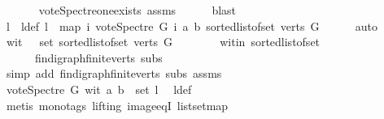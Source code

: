 \begin{isabellebody}
\ \ \ \ \isamarkupfalse%
\ \ vote{\isacharunderscore}{\kern0pt}Spectre{\isacharunderscore}{\kern0pt}one{\isacharunderscore}{\kern0pt}exists\ assms\isanewline
\ \ \ \ \isamarkupfalse%
\ blast\ \isanewline
\ \ \isamarkupfalse%
\ l\ \ l{\isacharunderscore}{\kern0pt}def{\isacharcolon}{\kern0pt}\ {\isachardoublequoteopen}l\ {\isacharequal}{\kern0pt}\ {\isacharparenleft}{\kern0pt}map\ {\isacharparenleft}{\kern0pt}{\isasymlambda}i{\isachardot}{\kern0pt}\ vote{\isacharunderscore}{\kern0pt}Spectre\ G\ i\ a\ b{\isacharparenright}{\kern0pt}\ {\isacharparenleft}{\kern0pt}sorted{\isacharunderscore}{\kern0pt}list{\isacharunderscore}{\kern0pt}of{\isacharunderscore}{\kern0pt}set\ {\isacharparenleft}{\kern0pt}verts\ G{\isacharparenright}{\kern0pt}{\isacharparenright}{\kern0pt}{\isacharparenright}{\kern0pt}{\isachardoublequoteclose}\isanewline
\ \ \ \ \isamarkupfalse%
\ auto\isanewline
\ \ \isamarkupfalse%
\ {\isachardoublequoteopen}wit\ {\isasymin}\ \ set\ {\isacharparenleft}{\kern0pt}sorted{\isacharunderscore}{\kern0pt}list{\isacharunderscore}{\kern0pt}of{\isacharunderscore}{\kern0pt}set\ {\isacharparenleft}{\kern0pt}verts\ G{\isacharparenright}{\kern0pt}{\isacharparenright}{\kern0pt}{\isachardoublequoteclose}\ \isanewline
\ \ \ \ \isamarkupfalse%
\ \ wit{\isacharunderscore}{\kern0pt}in\ sorted{\isacharunderscore}{\kern0pt}list{\isacharunderscore}{\kern0pt}of{\isacharunderscore}{\kern0pt}set{\isacharparenleft}{\kern0pt}{}{\isacharparenright}{\kern0pt}\ \isanewline
\ \ \ \ \ \ fin{\isacharunderscore}{\kern0pt}digraph{\isachardot}{\kern0pt}finite{\isacharunderscore}{\kern0pt}verts\ subs\isanewline
\ \ \ \ \isamarkupfalse%
\ {\isacharparenleft}{\kern0pt}simp\ add{\isacharcolon}{\kern0pt}\ fin{\isacharunderscore}{\kern0pt}digraph{\isachardot}{\kern0pt}finite{\isacharunderscore}{\kern0pt}verts\ subs\ assms{\isacharparenleft}{\kern0pt}{}{\isacharparenright}{\kern0pt}{\isacharparenright}{\kern0pt}\ \isanewline
\ \ \isamarkupfalse%
\ \isamarkupfalse%
\ {\isachardoublequoteopen}vote{\isacharunderscore}{\kern0pt}Spectre\ G\ wit\ a\ b\ {\isasymin}\ set\ l{\isachardoublequoteclose}\ \isamarkupfalse%
\ l{\isacharunderscore}{\kern0pt}def\isanewline
\ \ \ \ \isamarkupfalse%
\ {\isacharparenleft}{\kern0pt}metis\ {\isacharparenleft}{\kern0pt}mono{\isacharunderscore}{\kern0pt}tags{\isacharcomma}{\kern0pt}\ lifting{\isacharparenright}{\kern0pt}\ image{\isacharunderscore}{\kern0pt}eqI\ list{\isachardot}{\kern0pt}set{\isacharunderscore}{\kern0pt}map{\isacharparenright}{\kern0pt}\isanewline

\end{isabellebody}
